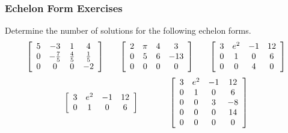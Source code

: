 \documentclass[xcolor=dvipsnames]{beamer}
\begin{document}
\begin{frame}
  \frametitle{Echelon Form Exercises}
  {\ubung} Determine the number of solutions for the following echelon
  forms.
  \begin{equation}
    \label{eq:uababohk}
    \left[
      \begin{array}{cccc}
        5 & -3 & 1 & 4 \\
        0 & -\frac{7}{5} & \frac{4}{5} & \frac{1}{5} \\
        0 & 0 & 0 & -2
      \end{array}\right]\hspace{.25in}\left[
      \begin{array}{cccc}
        2 & \pi & 4 & 3 \\
        0 & 5 & 6 & -13 \\
        0 & 0 & 0 & 0
      \end{array}\right]\hspace{.25in}\left[
      \begin{array}{cccc}
        3 & e^{2} & -1 & 12 \\
        0 & 1 & 0 & 6 \\
        0 & 0 & 4 & 0
      \end{array}\right]\notag
  \end{equation}
  \begin{equation}
    \label{eq:oataequa}
    \left[
      \begin{array}{cccc}
        3 & e^{2} & -1 & 12 \\
        0 & 1 & 0 & 6
      \end{array}\right]\hspace{.5in}\left[
      \begin{array}{cccc}
        3 & e^{2} & -1 & 12 \\
        0 & 1 & 0 & 6 \\
        0 & 0 & 3 & -8 \\
        0 & 0 & 0 & 14 \\
        0 & 0 & 0 & 0
      \end{array}\right]\notag
  \end{equation}
\end{frame}
\end{document}
